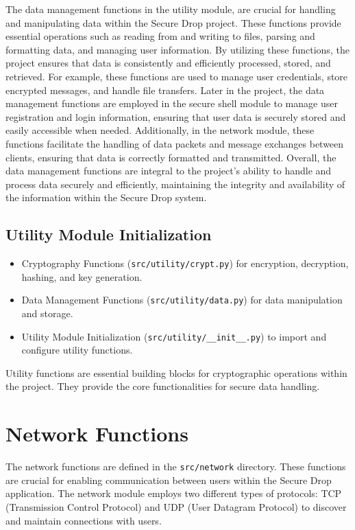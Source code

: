 \documentclass[12pt]{article}
\begin{document}
The data management functions in the utility module, are crucial for handling and manipulating data within the Secure Drop project. These functions provide essential operations such as reading from and writing to files, parsing and formatting data, and managing user information. By utilizing these functions, the project ensures that data is consistently and efficiently processed, stored, and retrieved. For example, these functions are used to manage user credentials, store encrypted messages, and handle file transfers. Later in the project, the data management functions are employed in the secure shell module to manage user registration and login information, ensuring that user data is securely stored and easily accessible when needed. Additionally, in the network module, these functions facilitate the handling of data packets and message exchanges between clients, ensuring that data is correctly formatted and transmitted. Overall, the data management functions are integral to the project's ability to handle and process data securely and efficiently, maintaining the integrity and availability of the information within the Secure Drop system.

\subsection{Utility Module Initialization}


\begin{itemize}
    \item Cryptography Functions (\texttt{src/utility/crypt.py}) for encryption, decryption, hashing, and key generation.
    \item Data Management Functions (\texttt{src/utility/data.py}) for data manipulation and storage.
    \item Utility Module Initialization (\texttt{src/utility/\_\_init\_\_.py}) to import and configure utility functions.
\end{itemize}

Utility functions are essential building blocks for cryptographic operations within the project. They provide the core functionalities for secure data handling.

\newpage

\section{Network Functions}
The network functions are defined in the \texttt{src/network} directory. These functions are crucial for enabling communication between users within the Secure Drop application. The network module employs two different types of protocols: TCP (Transmission Control Protocol) and UDP (User Datagram Protocol) to discover and maintain connections with users.
\end{document}
